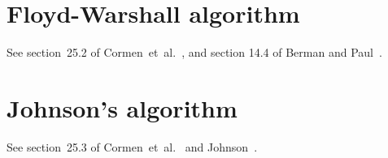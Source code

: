 
\section{Floyd-Warshall algorithm}

See section~25.2 of Cormen~et~al.~\cite{CormenEtAl2001}, and section
14.4 of Berman and Paul~\cite{BermanPaul1997}.



\section{Johnson's algorithm}

See section~25.3 of Cormen~et~al.~\cite{CormenEtAl2001} and
Johnson~\cite{Johnson1977}.
